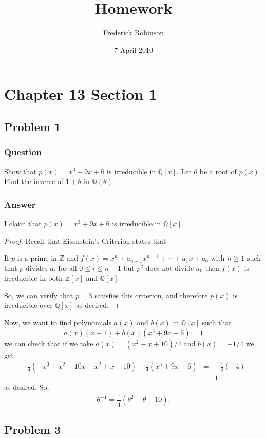 \documentclass[10pt]{article}
\title{Homework}
\author{Frederick Robinson}
\date{7 April 2010}
\begin{document}

   \maketitle

\setcounter{tocdepth}{2} 

\tableofcontents

\section{Chapter 13 Section 1}
\subsection{Problem 1}

\subsubsection{Question}
Show that $p(x)=x^3+9x+6$ is irreducible in $\mathbb{Q}[x]$. Let $\theta$ be a root of $p(x)$. Find the inverse of $1+\theta$ in $\mathbb{Q}(\theta)$
\subsubsection{Answer}
I claim that $p(x)=x^3+9x+6$ is irreducible in $\mathbb{Q}[x]$.
\begin{proof}
Recall that Eisenstein's Criterion states that

If $p$ is a prime in $\mathbb{Z}$ and $f(x)=x^n+a_{n-1}x^{n-1}+ \cdots +a_1 x+a_0$ with $n \geq1$ such that $p$ divides $a_i$ for all $0\leq i \leq n-1$ but $p^2$ does not divide $a_0$ then $f(x)$ is irreducible in both $\mathbb{Z}[x]$ and $\mathbb{Q}[x]$

So, we can verify that $p=3$ satisfies this criterion, and therefore $p(x)$ is irreducible over $\mathbb{Q}[x]$ as desired.
\end{proof}

Now, we want to find polynomials $a(x)$ and $b(x)$ in $\mathbb{Q}[x]$ such that
\[a(x)(x+1)+b(x)(x^3+9x+6)=1\]
we can check that if we take $a(x)=(x^2-x+10)/4$ and $b(x)=-1/4$ we get
\begin{eqnarray*}
-\frac{1}{4}(-x^3+x^2-10x-x^2+x-10)-\frac{1}{4}(x^3+9x+6)&=&-\frac{1}{4}(-4)\\
&=&1
\end{eqnarray*}
as desired. So, 
\[\theta^{-1}=\frac{1}{4}(\theta^2-\theta+10).\]
\subsection{Problem 3}
\end{document}
